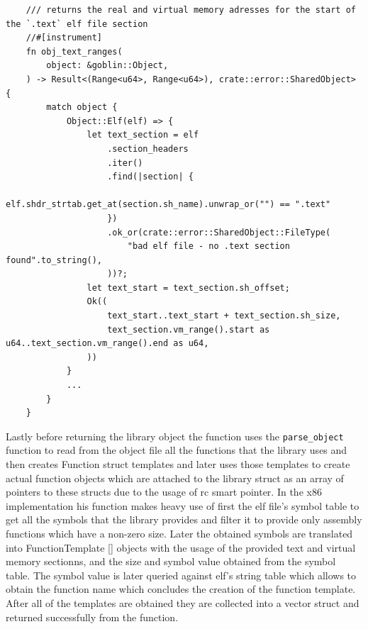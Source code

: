 \begin{lstlisting}
    /// returns the real and virtual memory adresses for the start of the `.text` elf file section
    //#[instrument]
    fn obj_text_ranges(
        object: &goblin::Object,
    ) -> Result<(Range<u64>, Range<u64>), crate::error::SharedObject> {
        match object {
            Object::Elf(elf) => {
                let text_section = elf
                    .section_headers
                    .iter()
                    .find(|section| {
                        elf.shdr_strtab.get_at(section.sh_name).unwrap_or("") == ".text"
                    })
                    .ok_or(crate::error::SharedObject::FileType(
                        "bad elf file - no .text section found".to_string(),
                    ))?;
                let text_start = text_section.sh_offset;
                Ok((
                    text_start..text_start + text_section.sh_size,
                    text_section.vm_range().start as u64..text_section.vm_range().end as u64,
                ))
            }
            ...
        }
    }
\end{lstlisting}

Lastly before returning the library object the function uses the \verb|parse_object| function to read from the object file all the functions that the library uses and then creates Function struct templates and later uses those templates to create actual function objects which are attached to the library struct as an array of pointers to these structs due to the usage of rc smart pointer.
In the x86 implementation his function makes heavy use of first the elf file's symbol table to get all the symbols that the library provides and filter it to provide only assembly functions which have a non-zero size.
Later the obtained symbols are translated into FunctionTemplate \ref{} objects with the usage of the provided text and virtual memory sectionns, and the size and symbol value obtained from the symbol table. 
The symbol value is later queried against elf's string table which allows to obtain the function name which concludes the creation of the function template.
After all of the templates are obtained they are collected into a vector struct and returned successfully from the function.

